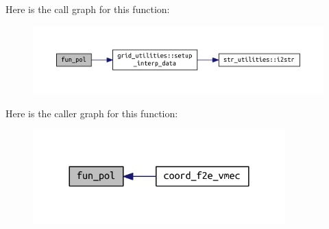 Here is the call graph for this function\+:
\nopagebreak
\begin{figure}[H]
\begin{center}
\leavevmode
\includegraphics[width=350pt]{grid__utilities_8f90_a38078beae178a5dcd051e2ed858d4d35_cgraph}
\end{center}
\end{figure}
Here is the caller graph for this function\+:
\nopagebreak
\begin{figure}[H]
\begin{center}
\leavevmode
\includegraphics[width=276pt]{grid__utilities_8f90_a38078beae178a5dcd051e2ed858d4d35_icgraph}
\end{center}
\end{figure}
